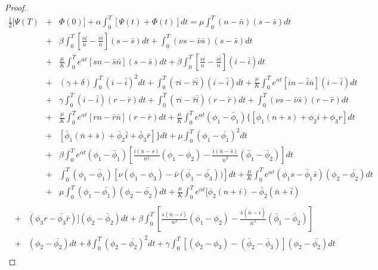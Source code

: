\begin{proof}
\begin{eqnarray*}
	\frac{1}{2}[\Psi(T)&+&\Phi(0)]+\alpha\int_{0}^{T}[\Psi(t)+\Phi(t)]dt=\mu\int_{0}^{T}(n-\bar{n})(s-\bar{s})dt\\
	&+&\beta\int_{0}^{T}\left[\frac{si}{n}-\frac{\bar{s}\bar{i}}{\bar{n}}\right](s-\bar{s})dt+\int_{0}^{T}(\nu s-\bar{\nu}\bar{s})(s-\bar{s})dt\\
	&+&\frac{\mu}{K}\int_{0}^{T} e^{\alpha t}\left[sn-\bar{s}\bar{n}\right](s-\bar{s})dt+\beta\int_{0}^{T}\left[\frac{si}{n}-\frac{\bar{s}\bar{i}}{\bar{n}}\right](i-\bar{i})dt\\
	&+&(\gamma+\delta)\int_{0}^{T}(i-\bar{i})^2dt+\int_{0}^{T}(\tau i-\bar{\tau}\bar{i})(i-\bar{i})dt+\frac{\mu}{K}\int_{0}^{T} e^{\alpha t}\left[in-\bar{i}\bar{n}\right](i-\bar{i})dt\\
	&+&\gamma\int_{0}^{T}(i-\bar{i})(r-\bar{r})dt+\int_{0}^{T}(\tau i-\bar{\tau}\bar{i})(r-\bar{r})dt+\int_{0}^{T}(\nu s-\bar{\nu}\bar{s})(r-\bar{r})dt\\
	&+&\frac{\mu}{K}\int_{0}^{T} e^{\alpha t}\left[rn-\bar{r}\bar{n}\right](r-\bar{r})dt+\frac{\mu}{K}\int_{0}^{T}e^{\alpha t}(\phi_1-\bar{\phi}_1)\{[\phi_1(n+s)+\phi_2 i +\phi_3 r]dt\\
	&+&[\bar{\phi}_1(\bar{n}+\bar{s})+\bar{\phi}_2 \bar{i} +\bar{\phi}_3 \bar{r}]\}dt+\mu\int_{0}^{T}(\phi_1-\bar{\phi_1})^2dt\\
	&+&\beta\int_{0}^{T}e^{\alpha t}(\phi_1-\bar{\phi}_1)\left[\frac{i(n-s)}{n^2}(\phi_1-\phi_2)-\frac{\bar{i}(\bar{n}-\bar{s})}{\bar{n}^2}(\bar{\phi}_1-\bar{\phi}_2)\right]dt\\
	&+&\int_{0}^{T} (\phi_1-\bar{\phi}_1)[\nu(\phi_1-\phi_3)-\bar{\nu}(\bar{\phi_1}-\bar{\phi_3}))]dt+\frac{\mu}{K}\int_{0}^{T}e^{\alpha t}(\phi_1s-\bar{\phi}_1\bar{s})(\phi_2-\bar{\phi_2})dt\\
	&+&\mu\int_{0}^{T}(\phi_1-\bar{\phi_1})(\phi_2-\bar{\phi_2})dt+\frac{\mu}{K}\int_{0}^{T}e^{\alpha t}[\phi_2(n+i)-\bar{\phi}_2(\bar{n}+\bar{i}) \nonumber\\
\end{eqnarray*}
\begin{eqnarray*}	
	&+& (\phi_3 r-\bar{\phi_3}\bar{r})](\phi_2-\bar{\phi}_2)dt+\beta\int_{0}^{T}\left[\frac{s(n-i)}{n^2}(\phi_1-\phi_2)-\frac{\bar{s}(\bar{n}-\bar{i})}{\bar{n}^2}(\bar{\phi}_1-\bar{\phi}_2)\right] \nonumber\\
	&+&(\phi_2-\bar{\phi_2})dt+\delta\int_{0}^{T}(\phi_2-\bar{\phi_2})^2dt +\gamma\int_{0}^{T}[(\phi_2-\phi_3)-(\bar{\phi}_2-\bar{\phi}_3)](\phi_2-\bar{\phi_2})dt \nonumber\\

\end{eqnarray*}
\end{proof}
